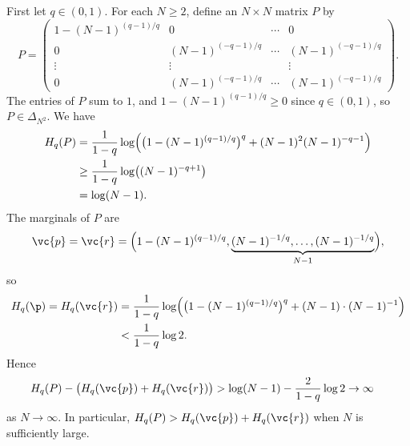 First let $q \in (0, 1)$.  For each $N \geq 2$, define an $N \times N$
matrix $P$ by
\[
P
=
\begin{pmatrix}
1 - (N - 1)^{(q - 1)/q} &
0                       &\cdots &0      \\
0                       &
(N - 1)^{(-q-1)/q}      &\cdots &(N - 1)^{(-q-1)/q}      \\
\vdots                  &
\vdots                  &       &\vdots \\
0                       &
(N - 1)^{(-q-1)/q}      &\cdots &(N - 1)^{(-q-1)/q}      
\end{pmatrix}.
\]
The entries of $P$ sum to $1$, and $1 - (N - 1)^{(q - 1)/q} \geq 0$ since
$q \in (0, 1)$, so $P \in \Delta_{N^2}$.  We have
% 
\begin{align*}
H_q(P)  &
=
\frac{1}{1 - q}
\log
\Bigl(
\bigl( 1 - (N - 1)^{(q - 1)/q} \bigr)^q
+
(N - 1)^2 (N - 1)^{-q - 1}
\Bigr)  \\
&
\geq
\frac{1}{1 - q}
\log
\bigl(
(N - 1)^{-q + 1}
\bigr)  \\
&
=
\log(N - 1).
\end{align*}
% 
The marginals of $P$ are
\[
\vc{p} = \vc{r} = 
\Bigl( 
1 - (N - 1)^{(q - 1)/q}, 
\underbrace{(N - 1)^{-1/q}, \ldots, (N - 1)^{-1/q}}_{N - 1}
\Bigr),
\]
so
% 
\begin{align*}
H_q(\p) = H_q(\vc{r}) &
=
\frac{1}{1 - q} 
\log
\Bigl( 
\bigl( 1 - (N - 1)^{(q - 1)/q} \bigr)^q
+
(N - 1) \cdot (N - 1)^{-1}
\Bigr)  \\
&
<
\frac{1}{1 - q} \log 2.
\end{align*}
% 
Hence
% 
\begin{align*}
H_q(P) - \bigl( H_q(\vc{p}) + H_q(\vc{r}) \bigr)        &
>
\log(N - 1) - \frac{2}{1 - q} \log 2    
\to 
\infty
\end{align*}
% 
as $N \to \infty$.  In particular, $H_q(P) > H_q(\vc{p}) + H_q(\vc{r})$
when $N$ is sufficiently large.

